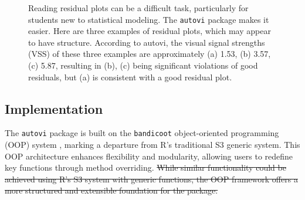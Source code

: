 \documentclass[
doublespace,
  times]{anzsauth}
\providecommand{\DIFdel}[1]{{\protect\color{red}\sout{#1}}}                      %
\providecommand{\DIFdelbegin}{} %
\providecommand{\DIFdelend}{} %
\providecommand{\DIFaddbeginFL}{} %
\providecommand{\DIFaddendFL}{} %
\providecommand{\DIFdelbeginFL}{} %
\providecommand{\DIFdelendFL}{} %
\newcommand{\DIFscaledelfig}{0.5}
\newlength{\DIFdelgraphicswidth} %
\newlength{\DIFdelgraphicsheight} %
\newcommand{\DIFaddincludegraphics}[2][]{{\color{blue}\fbox{\DIFOincludegraphics[#1]{#2}}}} %
\newcommand{\DIFdelincludegraphics}[2][]{%
\sbox{\DIFdelgraphicsbox}{\DIFOincludegraphics[#1]{#2}}%
\settoboxwidth{\DIFdelgraphicswidth}{\DIFdelgraphicsbox} %
\settoboxtotalheight{\DIFdelgraphicsheight}{\DIFdelgraphicsbox} %
\scalebox{\DIFscaledelfig}{%
\parbox[b]{\DIFdelgraphicswidth}{\usebox{\DIFdelgraphicsbox}\\[-\baselineskip] \rule{\DIFdelgraphicswidth}{0em}}\llap{\resizebox{\DIFdelgraphicswidth}{\DIFdelgraphicsheight}{%
\setlength{\unitlength}{\DIFdelgraphicswidth}%
\begin{picture}(1,1)%
\thicklines\linethickness{2pt} %
{\color[rgb]{1,0,0}\put(0,0){\framebox(1,1){}}}%
{\color[rgb]{1,0,0}\put(0,0){\line( 1,1){1}}}%
{\color[rgb]{1,0,0}\put(0,1){\line(1,-1){1}}}%
\end{picture}%
}\hspace*{3pt}}} %
} %
\DeclareRobustCommand{\DIFdelbegin}{\DIFOdelbegin \let\includegraphics\DIFdelincludegraphics} %
\DeclareRobustCommand{\DIFdelend}{\DIFOaddend \let\includegraphics\DIFOincludegraphics} %
\DeclareRobustCommand{\DIFaddbeginFL}{\DIFOaddbeginFL \let\includegraphics\DIFaddincludegraphics} %
\DeclareRobustCommand{\DIFaddendFL}{\DIFOaddendFL \let\includegraphics\DIFOincludegraphics} %
\DeclareRobustCommand{\DIFdelbeginFL}{\DIFOdelbeginFL \let\includegraphics\DIFdelincludegraphics} %
\DeclareRobustCommand{\DIFdelendFL}{\DIFOaddendFL \let\includegraphics\DIFOincludegraphics} %
\begin{document}
\begin{figure}

\DIFdelbeginFL %


\DIFdelendFL \DIFaddbeginFL {}
\DIFaddendFL

\caption{\label{fig-three-examples}Reading residual plots can be a
difficult task, particularly for students new to statistical modeling.
The \texttt{autovi} package makes it easier. Here are three examples of
residual plots, which may appear to have structure. According to autovi,
the visual signal strengths (VSS) of these three examples are
approximately (a) 1.53, (b) 3.57, (c) 5.87, resulting in (b), (c) being
significant violations of good residuals, but (a) is consistent with a
good residual plot.}

\end{figure}%

\subsection{Implementation}\label{sec-autovi-implementation}

The \texttt{autovi} package is built on the \texttt{bandicoot}
object-oriented programming (OOP) system \citep{bandicoot}, marking a
departure from R's traditional S3 generic system. This OOP architecture
enhances flexibility and modularity, allowing users to redefine key
functions through method overriding.
\DIFdelbegin \DIFdel{While similar functionality could
be achieved using R's S3 system with generic functions, the OOP
framework offers a more structured and extensible foundation for the
package.
}\DIFdelend
\end{document}
